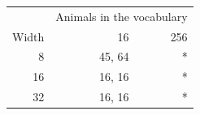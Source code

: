 \begin{tabular}{@{}rrr@{}}
\toprule
 & \multicolumn{2}{c}{Animals in the vocabulary} \\
Width & 16 & 256 \\
\midrule
8 & 45, 64 & * \\
16 & 16, 16 & * \\
32 & 16, 16 & * \\
\bottomrule
\end{tabular}
